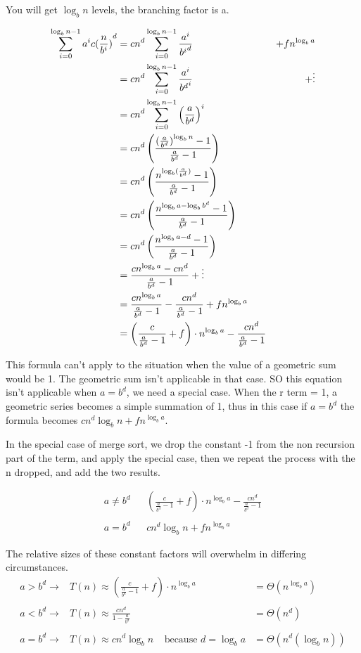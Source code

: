 \documentclass[english, 10pt]{article}
\begin{document}
You will get $\log_b n$ levels, the branching factor is a.

\begin{align*}
    \sum_{i=0}^{\log_b n-1} a^i c {(\frac{n}{b^i})}^d &= cn^d \sum_{i=0}^{\log_b n-1}\frac{a^i}{{b^i}^d} &+ fn^{\log_b a} \\
    &= cn^d \sum_{i=0}^{\log_b n-1}\frac{a^i}{{b^d}^i} &+ \vdots\\
    &= cn^d \sum_{i=0}^{\log_b n-1}{\left(  \frac{a}{b^d}\right)}^i \\
    &= cn^d \left(\frac{{(\frac{a}{b^d})}^{\log_b n}-1}{\frac{a}{b^d}-1}\right) \\
    &=cn^d \left( \frac{n^{\log_b (\frac{a}{b^d})} -1 }{\frac{a}{b^d}-1 } \right) \\
    &=cn^d \left( \frac{n^{\log_b {a} -\log_b{b^d}} -1 }{\frac{a}{b^d}-1 } \right) \\
    &=cn^d \left( \frac{n^{\log_b {a} -d} -1 }{\frac{a}{b^d}-1 } \right) \\
    &= \frac{cn^{\log_b {a}} -cn^d }{\frac{a}{b^d}-1 } +\vdots \\
    &=\frac{cn^{\log_b a}}{\frac{a}{b^d}-1} - \frac{cn^d}{\frac{a}{b^d}-1} + fn^{\log_b a} \\
    &=\left( \frac{c}{\frac{a}{b^d}-1}+f \right)\cdot{n^{\log_b a}} - \frac{cn^d}{\frac{a}{b^d}-1} \\
\end{align*}

This formula can't apply to the situation when the value of a geometric sum
would be 1. The geometric sum isn't applicable in that case. SO this equation
isn't applicable when $a=b^d$, we need a special case. When the r term = 1, a
geometric series becomes a simple summation of 1, thus in this case if $a=b^d$
the formula becomes $cn^d \log_b n + fn^{\log_b a}$.

In the special case of merge sort, we drop the constant -1 from the non
recursion part of the term, and apply the special case, then we repeat the
process with the n dropped, and add the two results.

\begin{align*}
    a\ne b^d && \left( \frac{c}{\frac{a}{b^d}-1}+f \right)\cdot{n^{\log_b a}} - \frac{cn^d}{\frac{a}{b^d}-1} \\\\
    a= b^d && cn^d \log_b n + fn^{\log_b a}
\end{align*}

The relative sizes of these constant factors will overwhelm in differing circumstances.
\begin{align*}
    a > b^d \rightarrow & T(n) \approx \left( \frac{c}{\frac{a}{b^d}-1}+f \right)\cdot n^{\log_b a}  &= \Theta (n^{\log_b a})\\\\
    a < b^d \rightarrow & T(n) \approx \frac{cn^d}{1-\frac{a}{b^d}} &= \Theta (n^d) \\\\
    a = b^d \rightarrow & T(n) \approx cn^d \log_b n \;\;\;\; \text{because $d = \log_b a$} &= \Theta (n^d(\log_b n))\\\\
\end{align*}
\end{document}
